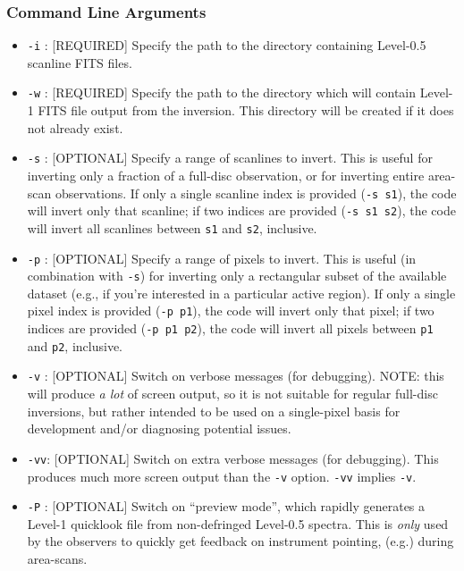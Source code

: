 \documentclass[11pt]{article}
\begin{document}
\subsubsection{Command Line Arguments}
\begin{itemize}
  \renewcommand\labelitemi{\scriptsize$\blacksquare$}
  \item \texttt{-i} : [REQUIRED] Specify the path to the directory containing \solisvsm Level-0.5 scanline FITS files.
  \item \texttt{-w} : [REQUIRED] Specify the path to the directory which will contain \solisvsm Level-1 FITS file output
                      from the inversion.  This directory will be created if it does not already exist.
  \item \texttt{-s} : [OPTIONAL] Specify a range of scanlines to invert.  This is useful for inverting only a fraction
                      of a full-disc observation, or for inverting entire area-scan observations.  If only a single scanline
                      index is provided (\texttt{-s s1}), the code will invert only that scanline; if two indices are provided
                      (\texttt{-s s1 s2}), the code will invert all scanlines between \texttt{s1} and \texttt{s2}, inclusive.
  \item \texttt{-p} : [OPTIONAL] Specify a range of pixels to invert.  This is useful (in combination with \texttt{-s})
                      for inverting only a rectangular subset of the available dataset (e.g., if you're 
                      interested in a particular active region).  If only a single pixel index is provided (\texttt{-p p1}),
                      the code will invert only that pixel; if two indices are provided (\texttt{-p p1 p2}), the code will
                      invert all pixels between \texttt{p1} and \texttt{p2}, inclusive.
  \item \texttt{-v} : [OPTIONAL] Switch on verbose messages (for debugging).  NOTE: this will produce \textit{a lot} of
                      screen output, so it is not suitable for regular full-disc inversions, but rather
                      intended to be used on a single-pixel basis for development and/or diagnosing potential
                      issues.
  \item \texttt{-vv}: [OPTIONAL] Switch on extra verbose messages (for debugging).  This produces much more screen
                      output than the \texttt{-v} option.  \texttt{-vv} implies \texttt{-v}.
  \item \texttt{-P} : [OPTIONAL] Switch on ``preview mode'', which rapidly generates a Level-1 quicklook file from
                      non-defringed Level-0.5 spectra.  This is \textit{only} used by the observers to quickly get
                      feedback on instrument pointing, (e.g.) during area-scans.
\end{itemize}
\end{document}
